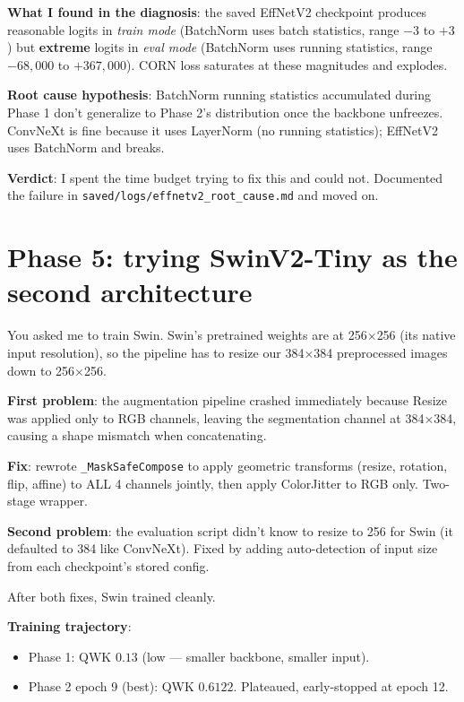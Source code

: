 \documentclass[11pt,a4paper]{article}
\begin{document}
\textbf{What I found in the diagnosis}: the saved EffNetV2 checkpoint produces reasonable logits in \emph{train mode} (BatchNorm uses batch statistics, range $-3$ to $+3$) but \textbf{extreme} logits in \emph{eval mode} (BatchNorm uses running statistics, range $-68{,}000$ to $+367{,}000$). CORN loss saturates at these magnitudes and explodes.

\textbf{Root cause hypothesis}: BatchNorm running statistics accumulated during Phase 1 don't generalize to Phase 2's distribution once the backbone unfreezes. ConvNeXt is fine because it uses LayerNorm (no running statistics); EffNetV2 uses BatchNorm and breaks.

\textbf{Verdict}: I spent the time budget trying to fix this and could not. Documented the failure in \texttt{saved/logs/effnetv2\_root\_cause.md} and moved on.

\section{Phase 5: trying SwinV2-Tiny as the second architecture}

You asked me to train Swin. Swin's pretrained weights are at 256$\times$256 (its native input resolution), so the pipeline has to resize our 384$\times$384 preprocessed images down to 256$\times$256.

\textbf{First problem}: the augmentation pipeline crashed immediately because Resize was applied only to RGB channels, leaving the segmentation channel at 384$\times$384, causing a shape mismatch when concatenating.

\textbf{Fix}: rewrote \texttt{\_MaskSafeCompose} to apply geometric transforms (resize, rotation, flip, affine) to ALL 4 channels jointly, then apply ColorJitter to RGB only. Two-stage wrapper.

\textbf{Second problem}: the evaluation script didn't know to resize to 256 for Swin (it defaulted to 384 like ConvNeXt). Fixed by adding auto-detection of input size from each checkpoint's stored config.

After both fixes, Swin trained cleanly.

\textbf{Training trajectory}:
\begin{itemize}
  \item Phase 1: QWK $0.13$ (low — smaller backbone, smaller input).
  \item Phase 2 epoch 9 (best): QWK $0.6122$. Plateaued, early-stopped at epoch 12.
\end{itemize}
\end{document}
